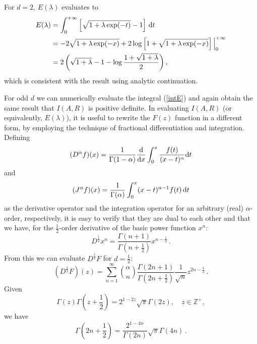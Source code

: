 \documentclass[11pt]{book}
\begin{document}
For $d=2$, $E(\lambda)$ evaluates to
\begin{equation}
  \begin{split}
  E(\lambda) &= \int^{+\infty}_0 \left[\sqrt{1+\lambda \exp(-t)} -1\right]\,{\rm d}t\\
  &= -2\sqrt{1+\lambda\exp(-x)} + 2\log\left[1+\sqrt{1+\lambda\exp(-x)}\right]\Big|^{+\infty}_0\\
  &= 2\left(\sqrt{1+\lambda} -1 -\log\frac{1+\sqrt{1+\lambda}}{2}\right),
  \end{split}
\end{equation}
which is consistent with the result using analytic continuation.

\bigbreak

For odd $d$ we can numerically evaluate the integral (\ref{intE}) and again obtain the same result that $I(A,R)$ is positive definite. In evaluating $I(A,R)$ (or equivalently, $E(\lambda)$), it is useful to rewrite the $F(z)$ function in a different form, by employing the technique of fractional differentiation and integration. Defining
\begin{equation}
  (D^\alpha f)(x)= \frac{1}{\Gamma(1-\alpha)}\frac{\rm d}{{\rm d}x}\int^x_0
  \frac{f(t)}{(x-t)^\alpha}{\rm d}t
\end{equation}
and
\begin{equation}
  (J^\alpha f)(x) = \frac{1}{\Gamma(\alpha)}\int^x_0(x-t)^{\alpha-1}f(t)\,{\rm d}t
\end{equation}
as the derivative operator and the integration operator for an arbitrary (real) $\alpha$-order, respectively, it is easy to verify that they are dual to each other and that we have, for the $\frac{1}{2}$-order derivative of the basic power function $x^n$:
\begin{equation}
  D^\frac{1}{2} x^n = \frac{\Gamma(n+1)}{\Gamma(n+\frac{1}{2})} x^{n-\frac{1}{2}}\,.
\end{equation}
From this we can evaluate $D^\frac{1}{2} F$ for $d=\frac{1}{2}$:
\begin{equation}
  (D^\frac{1}{2} F)(z) = \sum^\infty_{n=1} \binom{\alpha}{n} \frac{\Gamma(2n+1)}{\Gamma(2n+\frac{1}{2})}\frac{1}{\sqrt{n}}z^{2n-\frac{1}{2}}\,.
\end{equation}
Given
\begin{equation}
  \Gamma(z)\Gamma(z+\frac{1}{2})=2^{1-2z}\sqrt{\pi}\Gamma(2z),\quad z\in\mathbb{Z}^+,
\end{equation}
we have
\begin{equation}
  \Gamma(2n+\frac{1}{2}) = \frac{2^{1-4n}}{\Gamma(2n)}\sqrt{\pi}\Gamma(4n)\,.
\end{equation}
\end{document}
